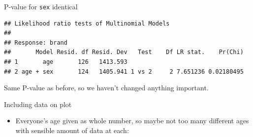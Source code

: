 \begin{frame}[fragile]{P-value for \texttt{sex} identical}
  
{\small  
 
\begin{knitrout}
\color{fgcolor}\begin{kframe}
\begin{alltt}
\end{alltt}
\begin{verbatim}
## Likelihood ratio tests of Multinomial Models
## 
## Response: brand
##       Model Resid. df Resid. Dev   Test    Df LR stat.    Pr(Chi)
## 1       age       126   1413.593                                 
## 2 age + sex       124   1405.941 1 vs 2     2 7.651236 0.02180495
\end{verbatim}
\end{kframe}
\end{knitrout}
}

Same P-value as before, so we haven't changed anything important.
  
\end{frame}

\begin{frame}[fragile]{Including data on plot}
  
  \begin{itemize}
  \item Everyone's age given as whole
    number, so maybe not too many different ages with sensible amount
    of data at each:
    
    \begin{footnotesize}
\begin{knitrout}
\color{fgcolor}
\end{knitrout}
    \end{footnotesize}
    
   
  \end{itemize}
  
\end{frame}

